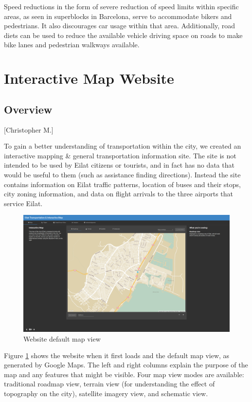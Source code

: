 \documentclass[12pt]{article}                       %
\begin{document}
Speed reductions in the form of severe reduction of speed limits within specific areas, as seen in superblocks in Barcelona, serve to accommodate bikers and pedestrians. It also discourages car usage within that area. Additionally, road diets can be used to reduce the available vehicle driving space on roads to make bike lanes and pedestrian walkways available.


\newpage
\section{Interactive Map Website}
\subsection{Overview}[Christopher M.]

To gain a better understanding of transportation within the city, we created an interactive mapping \& general transportation information site. The site is not intended to be used by Eilat citizens or tourists, and in fact has no data that would be useful to them (such as assistance finding directions). Instead the site contains information on Eilat traffic patterns, location of buses and their stops, city zoning information, and data on flight arrivals to the three airports that service Eilat. 

\begin{figure}[H]
    \centering
    \includegraphics[width=12cm]{images/site_map.png}
    \caption{Website default map view}
    \label{img:site_map}
\end{figure}

Figure \ref{img:site_map} shows the website when it first loads and the default map view, as generated by Google Maps. The left and right columns explain the purpose of the map and any features that might be visible. Four map view modes are available: traditional roadmap view, terrain view (for understanding the effect of topography on the city), satellite imagery view, and schematic view.
\end{document}

